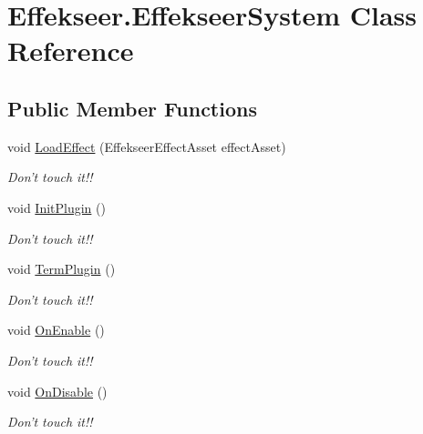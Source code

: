 \hypertarget{class_effekseer_1_1_effekseer_system}{\section{Effekseer.\-Effekseer\-System Class Reference}
\label{class_effekseer_1_1_effekseer_system}
}
\subsection*{Public Member Functions}
\begin{DoxyCompactItemize}
\item 
void \hyperlink{class_effekseer_1_1_effekseer_system_a9fd8b0498b1652552d562a84890acd8e}{Load\-Effect} (Effekseer\-Effect\-Asset effect\-Asset)
\begin{DoxyCompactList}\small\item\em Don't touch it!! \end{DoxyCompactList}\item 
void \hyperlink{class_effekseer_1_1_effekseer_system_a9f9623f5c80cb4ad197aaa0ea8e185bd}{Init\-Plugin} ()
\begin{DoxyCompactList}\small\item\em Don't touch it!! \end{DoxyCompactList}\item 
void \hyperlink{class_effekseer_1_1_effekseer_system_af1da0db69f6c0a2bb68ce459322078bf}{Term\-Plugin} ()
\begin{DoxyCompactList}\small\item\em Don't touch it!! \end{DoxyCompactList}\item 
void \hyperlink{class_effekseer_1_1_effekseer_system_ae53076ec94edc395e8e422c8f16fdf2e}{On\-Enable} ()
\begin{DoxyCompactList}\small\item\em Don't touch it!! \end{DoxyCompactList}\item 
void \hyperlink{class_effekseer_1_1_effekseer_system_a7a743450e7242c812ccb4d556f3a8a43}{On\-Disable} ()
\begin{DoxyCompactList}\small\item\em Don't touch it!! \end{DoxyCompactList}\end{DoxyCompactItemize}
